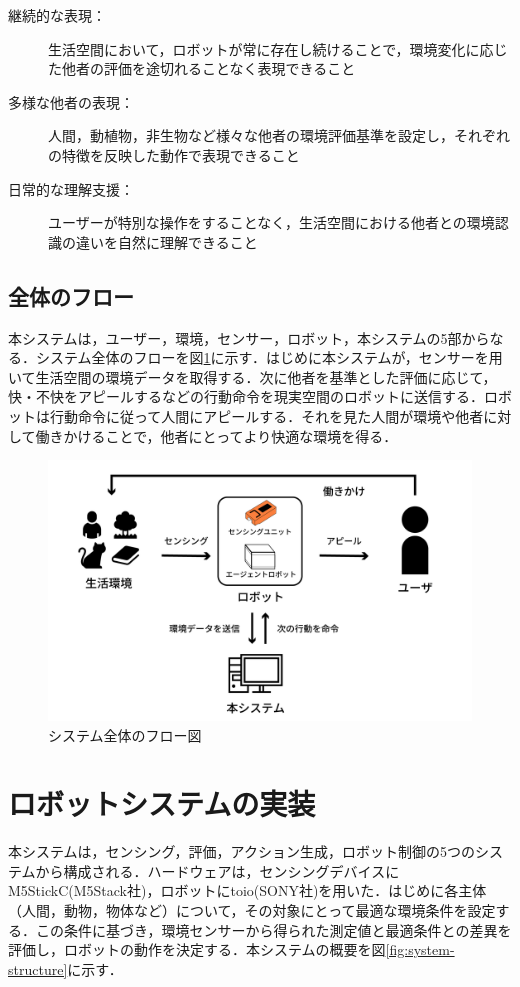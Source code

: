 \documentclass[paper=a4paper,jafontsize=9pt,head_space=15mm,gutter=20mm,
twocolumn,number_of_lines=49, line_length=26zw]{myuarticle}
\begin{document}
\begin{description}
  \item[継続的な表現：] 生活空間において，ロボットが常に存在し続けることで，環境変化に応じた他者の評価を途切れることなく表現できること
  \item[多様な他者の表現：] 人間，動植物，非生物など様々な他者の環境評価基準を設定し，それぞれの特徴を反映した動作で表現できること
  \item[日常的な理解支援：] ユーザーが特別な操作をすることなく，生活空間における他者との環境認識の違いを自然に理解できること
\end{description}

\subsection{全体のフロー}
本システムは，ユーザー，環境，センサー，ロボット，本システムの5部からなる．システム全体のフローを図\ref{fig:system-flow}に示す．はじめに本システムが，センサーを用いて生活空間の環境データを取得する．次に他者を基準とした評価に応じて，快・不快をアピールするなどの行動命令を現実空間のロボットに送信する．ロボットは行動命令に従って人間にアピールする．それを見た人間が環境や他者に対して働きかけることで，他者にとってより快適な環境を得る．

\begin{figure}[h]
  \centering
  \includegraphics[keepaspectratio,width=1.0\columnwidth]{resources/system_flow.png}
  \caption{システム全体のフロー図}
  \label{fig:system-flow}
\end{figure}

\section{ロボットシステムの実装}
本システムは，センシング，評価，アクション生成，ロボット制御の5つのシステムから構成される．ハードウェアは，センシングデバイスにM5StickC(M5Stack社)，ロボットにtoio(SONY社)を用いた．はじめに各主体（人間，動物，物体など）について，その対象にとって最適な環境条件を設定する．この条件に基づき，環境センサーから得られた測定値と最適条件との差異を評価し，ロボットの動作を決定する．本システムの概要を図\ref{fig:system-structure}に示す．
\end{document}
